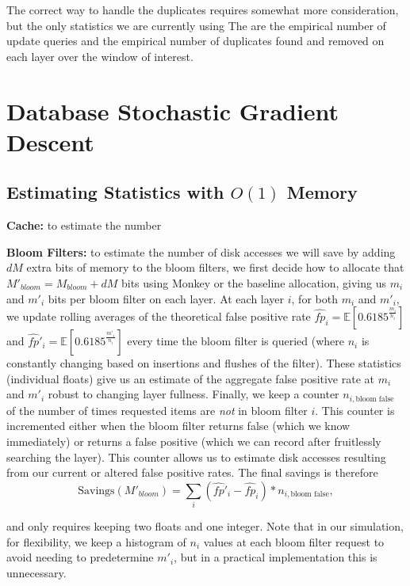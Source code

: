 \documentclass{sig-alternate-05-2015}
\begin{document}
The correct way to handle the duplicates requires somewhat more consideration, but the only statistics we are currently using The are the empirical number of update queries and the empirical number of duplicates found and removed on each layer over the window of interest.


\section{Database Stochastic Gradient Descent}

\subsection{Estimating Statistics with $O(1)$ Memory}

\textbf{Cache:} to estimate the number

\textbf{Bloom Filters:} to estimate the number of disk accesses we will save by adding $dM$ extra bits of memory to the bloom filters, we first decide how to allocate that $M'_{bloom} = M_{bloom}+dM$ bits using Monkey or the baseline allocation, giving us $m_i$ and $m'_i$ bits per bloom filter on each layer. At each layer $i$, for both $m_i$ and $m'_i$, we update rolling averages of the theoretical false positive rate $\hat{fp}_i = \mathbb{E}\left[0.6185^{\frac{m_i}{n_i}}\right]$ and $\hat{fp}'_i = \mathbb{E}\left[0.6185^{\frac{m'_i}{n_i}}\right]$ every time the bloom filter is queried (where $n_i$ is constantly changing based on insertions and flushes of the filter). These statistics (individual floats) give us an estimate of the aggregate false positive rate at $m_i$ and $m'_i$ robust to changing layer fullness. Finally, we keep a counter $n_{i,\text{bloom false}}$ of the number of times requested items are \textit{not} in bloom filter $i$. This counter is incremented either when the bloom filter returns false (which we know immediately) or returns a false positive (which we can record after fruitlessly searching the layer). This counter allows us to estimate disk accesses resulting from our current or altered false positive rates. The final savings is therefore \[
  \text{Savings}(M'_{bloom}) = \sum_{i} (\hat{fp}'_i - \hat{fp}_i) * n_{i,\text{bloom false}},
\]

and only requires keeping two floats and one integer. Note that in our simulation, for flexibility, we keep a histogram of $n_i$ values at each bloom filter request to avoid needing to predetermine $m'_i$, but in a practical implementation this is unnecessary.
\end{document}
